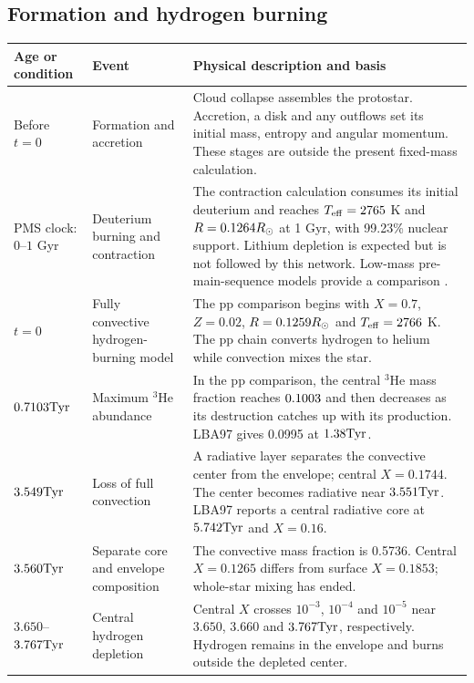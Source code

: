 \subsection{Formation and hydrogen burning}
{\small\renewcommand{\arraystretch}{1.17}
\begin{tabular}{@{}>{\raggedright\arraybackslash}p{}
 >{\raggedright\arraybackslash}p{}
 >{\raggedright\arraybackslash}p{}@{}}
\toprule
Age or condition & Event & Physical description and basis \\\midrule
Before $t=0$ & Formation and accretion &
Cloud collapse assembles the protostar. Accretion, a disk and any outflows
set its initial mass, entropy and angular momentum. These stages are outside
the present fixed-mass calculation. \\[4pt]
PMS clock:\newline $0$--$1$ Gyr & Deuterium burning and contraction &
The contraction calculation consumes its initial deuterium and reaches
$T_{\rm eff}=2765$ K and $R=0.1264R_\odot$ at 1 Gyr, with 99.23\% nuclear
support. Lithium depletion is expected but is not followed by this network.
Low-mass pre-main-sequence models provide a comparison \cite{baraffe15}. \\[4pt]
$t=0$ & Fully convective hydrogen-burning model &
The pp comparison begins with $X=0.7$, $Z=0.02$, $R=0.1259R_\odot$ and
$T_{\rm eff}=2766$ K. The pp chain converts hydrogen to helium while
convection mixes the star. \\[4pt]
$0.7103\mathrm{Tyr}$ & Maximum $^3$He abundance &
In the pp comparison, the central $^3$He mass fraction reaches $0.1003$ and
then decreases as its destruction catches up with its production.
LBA97 gives 0.0995 at $1.38\mathrm{Tyr}$. \\[4pt]
$3.549\mathrm{Tyr}$ & Loss of full convection &
A radiative layer separates the convective center from the envelope;
central $X=0.1744$. The center becomes radiative near $3.551\mathrm{Tyr}$.
LBA97 reports a central radiative core at $5.742\mathrm{Tyr}$ and $X=0.16$. \\[4pt]
$3.560\mathrm{Tyr}$ & Separate core and envelope composition &
The convective mass fraction is 0.5736. Central $X=0.1265$ differs from
surface $X=0.1853$; whole-star mixing has ended. \\[4pt]
$3.650$--$3.767\mathrm{Tyr}$ & Central hydrogen depletion &
Central $X$ crosses $10^{-3}$, $10^{-4}$ and $10^{-5}$ near
$3.650$, $3.660$ and $3.767\mathrm{Tyr}$, respectively. Hydrogen remains in the
envelope and burns outside the depleted center. \\[4pt]

\end{tabular}}

